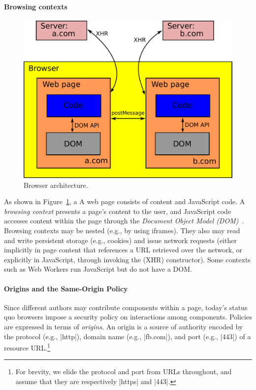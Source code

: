 \paragraph{Browsing contexts}
\iffigures
\begin{figure}
\begin{center}
\includegraphics[scale=0.35]{setting.pdf}
\end{center}
\vspace{-10pt}
\caption{\label{fig:primer-browser-arch} Browser architecture.}
\vspace{-10pt}
\end{figure}
As shown in Figure~\ref{fig:primer-browser-arch}, a \else A \fi web page
consists of content and JavaScript code.  A \emph{browsing context}
presents a page's content to the user, and JavaScript code accesses
content within the page through the \emph{Document Object Model
  (DOM)}~\cite{html5}. Browsing contexts may be nested (e.g., by using
iframes). They also may read and write persistent storage (e.g.,
cookies) and issue network requests (either implicitly in page content
that references a URL retrieved over the network, or explicitly in
JavaScript, through invoking the \xhr{} (XHR) constructor).  Some
contexts such as Web Workers run JavaScript but do not have a DOM.

\paragraph{Origins and the Same-Origin Policy}
Since different authors may contribute components within a page,
today's status quo browsers impose a security policy on interactions
among components. Policies are expressed in terms of \emph{origins}.
An origin is a source of authority encoded by the protocol (e.g.,
\js|http|), domain name (e.g., \js|fb.com|), and port (e.g., \js|443|)
of a resource URL.\footnote{For brevity, we elide the protocol and
  port from URLs throughout, and assume that they are respectively
  \js|https| and \js|443|.}


